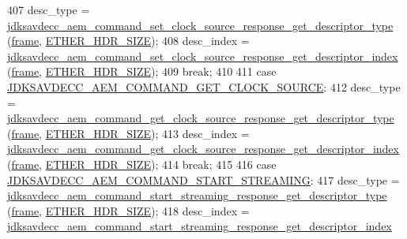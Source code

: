 \begin{DoxyCode}
407         desc\_type = 
      \hyperlink{group__command__set__clock__source__response_gaf651f455e5ae050ebb45c8b629216ad2}{jdksavdecc\_aem\_command\_set\_clock\_source\_response\_get\_descriptor\_type}
      (\hyperlink{gst__avb__playbin_8c_ac8e710e0b5e994c0545d75d69868c6f0}{frame}, \hyperlink{namespaceavdecc__lib_a6c827b1a0d973e18119c5e3da518e65ca9512ad9b34302ba7048d88197e0a2dc0}{ETHER\_HDR\_SIZE});
408         desc\_index = 
      \hyperlink{group__command__set__clock__source__response_gafece94c6286479a3c806d3997c73f3d5}{jdksavdecc\_aem\_command\_set\_clock\_source\_response\_get\_descriptor\_index}
      (\hyperlink{gst__avb__playbin_8c_ac8e710e0b5e994c0545d75d69868c6f0}{frame}, \hyperlink{namespaceavdecc__lib_a6c827b1a0d973e18119c5e3da518e65ca9512ad9b34302ba7048d88197e0a2dc0}{ETHER\_HDR\_SIZE});
409         \textcolor{keywordflow}{break};
410 
411     \textcolor{keywordflow}{case} \hyperlink{group__command_ga4d005d95910af9d509b33a7beba634d2}{JDKSAVDECC\_AEM\_COMMAND\_GET\_CLOCK\_SOURCE}:
412         desc\_type = 
      \hyperlink{group__command__get__clock__source__response_ga0e8da8583b547be389a3fd8205f78f26}{jdksavdecc\_aem\_command\_get\_clock\_source\_response\_get\_descriptor\_type}
      (\hyperlink{gst__avb__playbin_8c_ac8e710e0b5e994c0545d75d69868c6f0}{frame}, \hyperlink{namespaceavdecc__lib_a6c827b1a0d973e18119c5e3da518e65ca9512ad9b34302ba7048d88197e0a2dc0}{ETHER\_HDR\_SIZE});
413         desc\_index = 
      \hyperlink{group__command__get__clock__source__response_gad8b3114a21e48deca8292d646417d4ce}{jdksavdecc\_aem\_command\_get\_clock\_source\_response\_get\_descriptor\_index}
      (\hyperlink{gst__avb__playbin_8c_ac8e710e0b5e994c0545d75d69868c6f0}{frame}, \hyperlink{namespaceavdecc__lib_a6c827b1a0d973e18119c5e3da518e65ca9512ad9b34302ba7048d88197e0a2dc0}{ETHER\_HDR\_SIZE});
414         \textcolor{keywordflow}{break};
415 
416     \textcolor{keywordflow}{case} \hyperlink{group__command_ga02c5a086ab474b1e4d7786286811a680}{JDKSAVDECC\_AEM\_COMMAND\_START\_STREAMING}:
417         desc\_type = 
      \hyperlink{group__command__start__streaming__response_ga89f9710e58a269070610321fa9d67fc6}{jdksavdecc\_aem\_command\_start\_streaming\_response\_get\_descriptor\_type}
      (\hyperlink{gst__avb__playbin_8c_ac8e710e0b5e994c0545d75d69868c6f0}{frame}, \hyperlink{namespaceavdecc__lib_a6c827b1a0d973e18119c5e3da518e65ca9512ad9b34302ba7048d88197e0a2dc0}{ETHER\_HDR\_SIZE});
418         desc\_index = 
      \hyperlink{group__command__start__streaming__response_ga5d4e2d26cf8b8a6301bf06db86c020c8}{jdksavdecc\_aem\_command\_start\_streaming\_response\_get\_descriptor\_index}

\end{DoxyCode}
